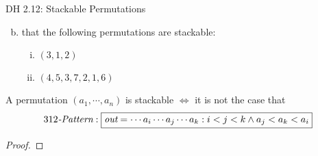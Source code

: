 \begin{frame}{}
  \begin{exampleblock}{DH 2.12: Stackable Permutations}
    \begin{enumerate}[(a)]
      \setcounter{enumi}{1}
    \item {} that the following permutations are \emph{} stackable:
	\begin{enumerate}[(i)]
	  \item $(3, 1, 2)$
	  \item $(4, 5, 3, 7, 2, 1, 6)$
	\end{enumerate}
    \end{enumerate}
  \end{exampleblock}



\end{frame}

\begin{frame}[fragile]{}
  \begin{theorem}
    A permutation $(a_1, \cdots, a_n)$ is stackable $\iff$ it is not the case that
    \[
      312\text{\it -Pattern}: \fbox{$\texttt{\it out} = \cdots a_i \cdots a_j \cdots a_k: i < j < k \land a_j < a_k < a_i$}
    \]
  \end{theorem}

  \vspace{0.30cm}
  \pause
  \begin{proof}
  \end{proof}

\end{frame}

